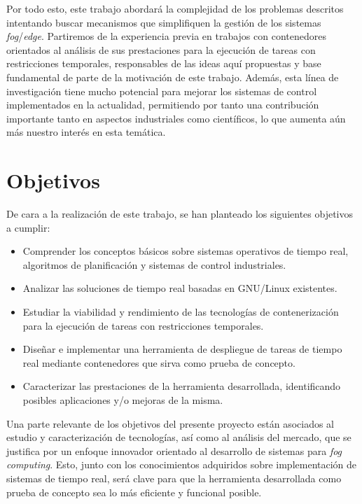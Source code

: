 Por todo esto, este trabajo abordará la complejidad de los problemas descritos
intentando buscar mecanismos que simplifiquen la gestión de los sistemas
\textit{fog}/\textit{edge}. Partiremos de la experiencia previa en trabajos con
contenedores orientados al análisis de sus prestaciones para la ejecución de
tareas con restricciones temporales, responsables de las ideas aquí propuestas y
base fundamental de parte de la motivación de este trabajo. Además, esta línea
de investigación tiene mucho potencial para mejorar los sistemas de control
implementados en la actualidad, permitiendo por tanto una contribución
importante tanto en aspectos industriales como científicos, lo que aumenta aún
más nuestro interés en esta temática.

\section{Objetivos}

De cara a la realización de este trabajo, se han planteado los siguientes
objetivos a cumplir:

\begin{itemize}
    \item Comprender los conceptos básicos sobre sistemas operativos de tiempo
          real, algoritmos de planificación y sistemas de control industriales.
    \item Analizar las soluciones de tiempo real basadas en GNU/Linux existentes.
    \item Estudiar la viabilidad y rendimiento de las tecnologías de
          contenerización para la ejecución de tareas con restricciones temporales.
    \item Diseñar e implementar una herramienta de despliegue de tareas de
          tiempo real mediante contenedores que sirva como prueba de concepto.
    \item Caracterizar las prestaciones de la herramienta desarrollada,
          identificando posibles aplicaciones y/o mejoras de la misma.
\end{itemize}

Una parte relevante de los objetivos del presente proyecto están asociados al
estudio y caracterización de tecnologías, así como al análisis del mercado, que
se justifica por un enfoque innovador orientado al desarrollo de sistemas para
\textit{fog computing}. Esto, junto con los conocimientos adquiridos sobre
implementación de sistemas de tiempo real, será clave para que la herramienta
desarrollada como prueba de concepto sea lo más eficiente y funcional posible.

